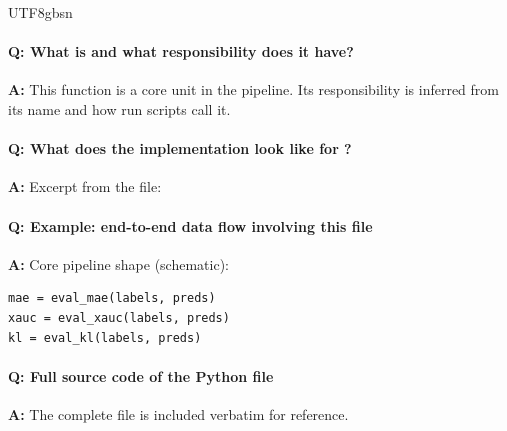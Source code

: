 \documentclass[11pt]{article}
\begin{document}
\begin{CJK*}{UTF8}{gbsn}
\vspace{1mm}


\paragraph{Q: What is \texttt{} and what responsibility does it have?}
\textbf{A:} This function is a core unit in the pipeline. Its responsibility is inferred from its name and how run scripts call it.

\paragraph{Q: What does the implementation look like for \texttt{}?}
\textbf{A:} Excerpt from the file:

\vspace{1mm}


\paragraph{Q: Example: end-to-end data flow involving this file}
\textbf{A:} Core pipeline shape (schematic):

\begin{Verbatim}[fontsize=\small]
mae = eval_mae(labels, preds)
xauc = eval_xauc(labels, preds)
kl = eval_kl(labels, preds)
\end{Verbatim}

\paragraph{Q: Full source code of the Python file}
\textbf{A:} The complete file is included verbatim for reference.


\end{CJK*}
\end{document}
